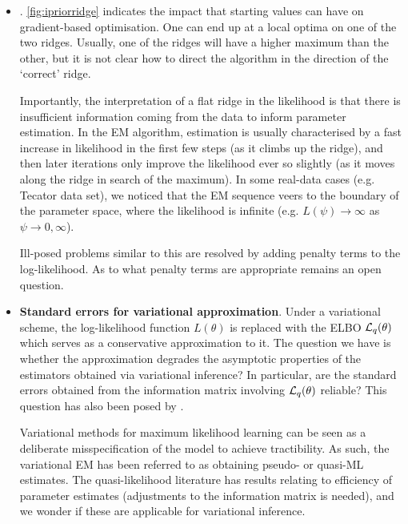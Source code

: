 \documentclass[a4paper,showframe,11pt]{report}
\begin{document}
\begin{itemize}
  \item {}.
  \cref{fig:ipriorridge} indicates the impact that starting values can have on gradient-based optimisation.
  One can end up at a local optima on one of the two ridges.
  Usually, one of the ridges will have a higher maximum than the other, but it is not clear how to direct the algorithm in the direction of the `correct' ridge.
  
  Importantly, the interpretation of a flat ridge in the likelihood is that there is insufficient information coming  from the data to inform parameter estimation.
  In the EM algorithm, estimation is usually characterised by a fast increase in likelihood in the first few steps (as it climbs up the ridge), and then later iterations only improve the likelihood ever so slightly (as it moves along the ridge in search of the maximum).
  In some real-data cases (e.g. Tecator data set), we noticed that the EM sequence veers to the boundary of the parameter space, where the likelihood is infinite (e.g. $L(\psi) \to \infty$ as $\psi\to 0,\infty$).
  
  Ill-posed problems similar to this are resolved by adding penalty terms to the log-likelihood.
  As to what penalty terms are appropriate remains an open question.
  
  \item \textbf{Standard errors for variational approximation}. 
  Under a variational scheme, the log-likelihood function $L(\theta)$ is replaced with the ELBO ${\mathcal L}_q(\theta)$ which serves as a  conservative approximation to it. 
  The question we have is whether the approximation degrades the asymptotic properties of the estimators obtained via variational inference?
  In particular, are the standard errors obtained from the information matrix involving ${\mathcal L}_q(\theta)$ reliable?
  This question has also been posed by \citet{hall2011asymptotic,bickel2013asymptotic,chen2017use}.
  
  Variational methods for maximum likelihood learning can be seen as a deliberate misspecification of the model to achieve tractibility. 
  As such, the variational EM has been referred to as obtaining pseudo- or quasi-ML estimates.
  The quasi-likelihood literature has results relating to efficiency of parameter estimates (adjustments to the information matrix is needed), and we wonder if these are applicable for variational inference.
  

\end{itemize}
\end{document}
